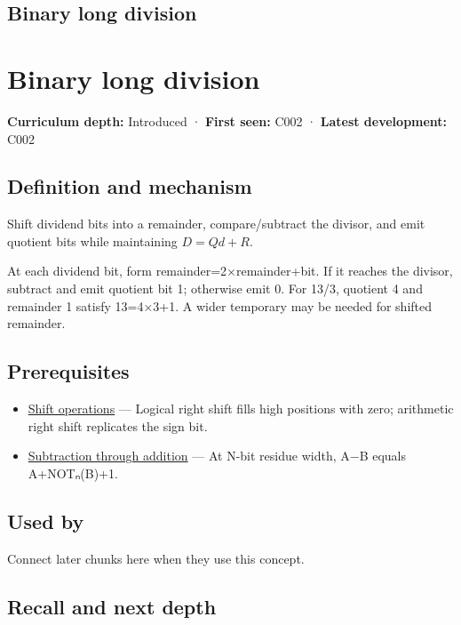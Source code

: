 \hypertarget{appendix-89985e6a2685}{}
\section*{Binary long division}
\chapter{Binary long division}\label{appendix-89985e6a2685-binary-long-division}

\textbf{Curriculum depth:} Introduced · \textbf{First seen:} C002 · \textbf{Latest development:} C002

\section{Definition and mechanism}\label{appendix-89985e6a2685-definition-and-mechanism}

Shift dividend bits into a remainder, compare/subtract the divisor, and emit quotient bits while maintaining \(D=Qd+R\).

At each dividend bit, form remainder=2×remainder+bit. If it reaches the divisor, subtract and emit quotient bit 1; otherwise emit 0. For 13/3, quotient 4 and remainder 1 satisfy 13=4×3+1. A wider temporary may be needed for shifted remainder.

\section{Prerequisites}\label{appendix-89985e6a2685-prerequisites}

\begin{itemize}
\tightlist
\item
  \hyperref[appendix-73425b25118e]{Shift operations} --- Logical right shift fills high positions with zero; arithmetic right shift replicates the sign bit.
\item
  \hyperref[appendix-1c7df340573e]{Subtraction through addition} --- At N-bit residue width, A−B equals A+NOTₙ(B)+1.
\end{itemize}

\section{Used by}\label{appendix-89985e6a2685-used-by}

Connect later chunks here when they use this concept.

\section{Recall and next depth}\label{appendix-89985e6a2685-recall-and-next-depth}

